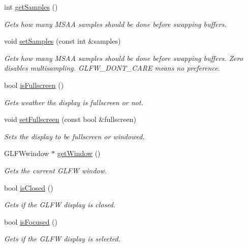 \begin{DoxyCompactItemize}
int \hyperlink{classflounder_1_1display_a3f1438e0d64121ae94e3e1f1931dc09a}{get\+Samples} ()
\begin{DoxyCompactList}\small\item\em Gets how many M\+S\+AA samples should be done before swapping buffers. \end{DoxyCompactList}\item 
void \hyperlink{classflounder_1_1display_ae1bf2028faaf411fedc80ca511a2e739}{set\+Samples} (const int \&samples)
\begin{DoxyCompactList}\small\item\em Gets how many M\+S\+AA samples should be done before swapping buffers. Zero disables multisampling. G\+L\+F\+W\+\_\+\+D\+O\+N\+T\+\_\+\+C\+A\+RE means no preference. \end{DoxyCompactList}\item 
bool \hyperlink{classflounder_1_1display_ad9a50aad9e26ea3f3a074d1dbe19c58a}{is\+Fullscreen} ()
\begin{DoxyCompactList}\small\item\em Gets weather the display is fullscreen or not. \end{DoxyCompactList}\item 
void \hyperlink{classflounder_1_1display_ae5ee27f982e6a947305dc6e71a23021b}{set\+Fullscreen} (const bool \&fullscreen)
\begin{DoxyCompactList}\small\item\em Sets the display to be fullscreen or windowed. \end{DoxyCompactList}\item 
G\+L\+F\+Wwindow $\ast$ \hyperlink{classflounder_1_1display_a5cdcd3dddce4cf63ac45503b03e96689}{get\+Window} ()
\begin{DoxyCompactList}\small\item\em Gets the current G\+L\+FW window. \end{DoxyCompactList}\item 
bool \hyperlink{classflounder_1_1display_af187a33ad8b4e112a638adfdd3062fb3}{is\+Closed} ()
\begin{DoxyCompactList}\small\item\em Gets if the G\+L\+FW display is closed. \end{DoxyCompactList}\item 
bool \hyperlink{classflounder_1_1display_a57dbf90706399fb0511b50740a1b77da}{is\+Focused} ()
\begin{DoxyCompactList}\small\item\em Gets if the G\+L\+FW display is selected. \end{DoxyCompactList}\item 

\end{DoxyCompactItemize}
